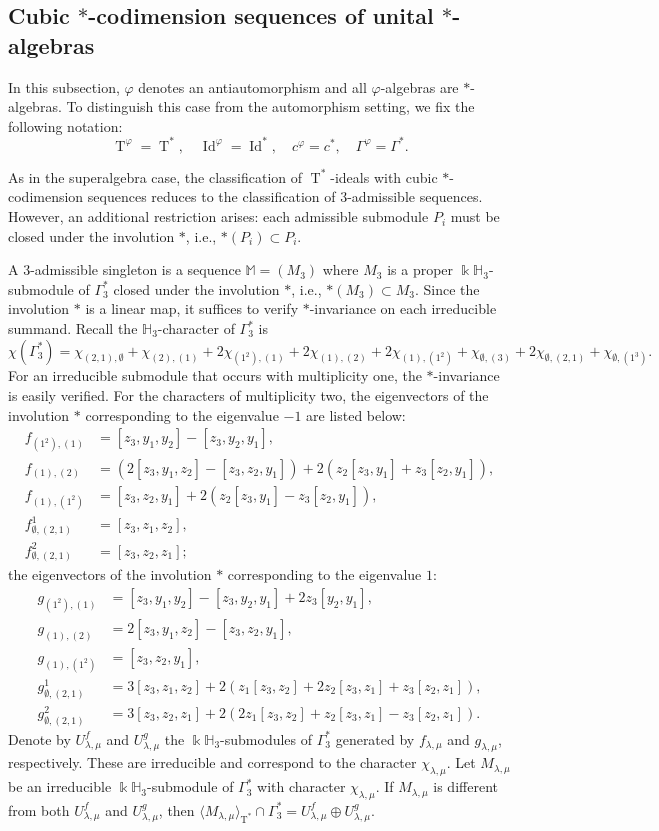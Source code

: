 \documentclass{amsart}
\theoremstyle{definition}
\theoremstyle{remark}
\numberwithin{equation}{section}
\def \Ga{\Gamma}
\def \la{\lambda}
\def \vp{\varphi}
\def \k{\Bbbk}
\def \H{\mathbb{H}}
\def \M{\mathbb{M}}
\def \Id{\operatorname{Id}}
\def \T{\operatorname{T}}
\def \es{\emptyset}
\begin{document}
\subsection{Cubic $*$-codimension sequences of unital $*$-algebras}
	In this subsection, $\vp$ denotes an antiautomorphism and all $\vp$-algebras are $*$-algebras. To distinguish this case from the automorphism setting, we fix the following notation:
	\[
	\T^\vp = \T^*, \quad \Id^\vp = \Id^*, \quad c^\vp = c^*, \quad \Ga^\vp = \Ga^*.
	\]

	As in the superalgebra case, the classification of $\T^*$-ideals with cubic $*$-codimension sequences reduces to the classification of $3$-admissible sequences. However, an additional restriction arises: each admissible submodule $P_i$ must be closed under the involution $*$, i.e., $*(P_i) \subset P_i$. 
	
	A $3$-admissible singleton is a sequence $\M = (M_3)$ where $M_3$ is a proper $\k\H_3$-submodule of $\Ga_3^*$ closed under the involution $*$, i.e., $*(M_3) \subset M_3 $. Since the involution $*$ is a linear map, it suffices to verify $*$-invariance on each irreducible summand. Recall the $\H_3$-character of $\Ga_3^*$ is
	\[
	\chi(\Ga_3^*) = \chi_{(2,1),\es} + \chi_{(2),(1)} + 2\chi_{(1^2),(1)} + 2\chi_{(1),(2)} + 2\chi_{(1),(1^2)} + \chi_{\es, (3)} + 2\chi_{\es, (2,1)} + \chi_{\es, (1^3)}.
	\]  
	For an irreducible submodule that occurs with multiplicity one, the $*$-invariance is easily verified. For the characters of multiplicity two, the eigenvectors of the involution $*$ corresponding to the eigenvalue $-1$ are listed below:
	\begin{align*}
		f_{(1^2),(1)} &= [z_3,y_1,y_2]-[z_3,y_2,y_1],\\
		f_{(1),(2)} &= (2[z_3,y_1,z_2]-[z_3,z_2,y_1])+2(z_2[z_3,y_1]+z_3[z_2,y_1]),\\
		f_{(1),(1^2)} &= [z_3,z_2,y_1]+2(z_2[z_3,y_1]-z_3[z_2,y_1]),\\
		f_{\es, (2,1)}^1 &= [z_3,z_1,z_2],\\
		f_{\es, (2,1)}^2 &= [z_3,z_2,z_1];
	\end{align*}
	the eigenvectors of the involution $*$ corresponding to the eigenvalue $1$:
	\begin{align*}
		g_{(1^2),(1)} &= [z_3,y_1,y_2]-[z_3,y_2,y_1]+2z_3[y_2,y_1],\\
		g_{(1),(2)} &= 2[z_3,y_1,z_2]-[z_3,z_2,y_1],\\
		g_{(1),(1^2)} &= [z_3,z_2,y_1],\\
		g_{\es, (2,1)}^1 &= 3[z_3,z_1,z_2]+2(z_1[z_3,z_2]+2z_2[z_3,z_1]+z_3[z_2,z_1]),\\
		g_{\es, (2,1)}^2 &= 3[z_3,z_2,z_1]+2(2z_1[z_3,z_2]+z_2[z_3,z_1]-z_3[z_2,z_1]).
	\end{align*}
	Denote by $U_{\la,\mu}^f$ and $U_{\la,\mu}^g$ the $\k\H_3$-submodules of $\Ga_3^*$ generated by $f_{\la,\mu}$ and $g_{\la,\mu}$, respectively. These are irreducible and correspond to the character $\chi_{\la,\mu}$. Let $M_{\la,\mu}$ be an irreducible $\k\H_3$-submodule of $\Ga_3^*$ with character $\chi_{\la,\mu}$. If $M_{\la,\mu}$ is different from both $U_{\la,\mu}^f$ and $U_{\la,\mu}^g$, then $\langle M_{\la,\mu}\rangle_{\T^*} \cap \Ga_3^* = U_{\la,\mu}^f \oplus U_{\la,\mu}^g$. 
	
\end{document}
